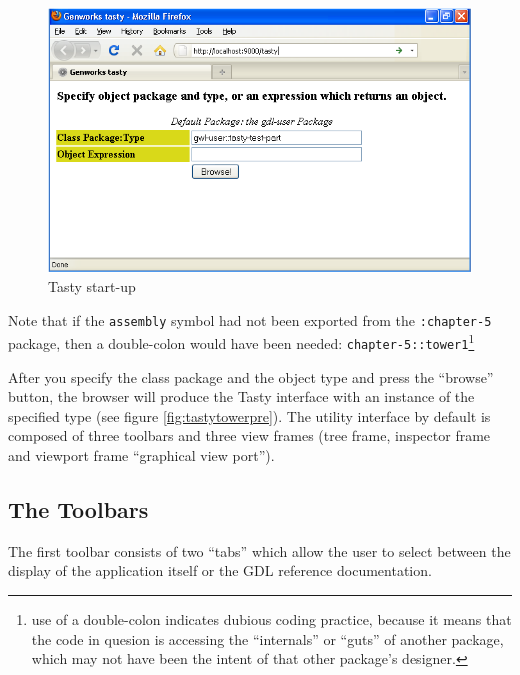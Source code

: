 \documentclass [11pt]{book}
\begin{document}
\begin{figure}
\begin{center}
\includegraphics{../images/tasty-start.png}
\end{center}

\caption{Tasty start-up}

\label{fig:tasty-startup}

\end{figure}


Note that if the \texttt{assembly} symbol had not been exported from the \texttt{:chapter-5} package, then a double-colon would have been needed: \texttt{chapter-5::tower1}\footnote{use of a double-colon indicates dubious coding
practice, because it means that the code in quesion is accessing the
``internals'' or ``guts'' of another package, which may not have been
the intent of that other package's designer.}



After you specify the class package and the object type and
press the ``browse'' button, the browser will produce the Tasty
interface with an instance of the specified type (see figure 
\ref{fig:tastytowerpre}). The utility interface
by default is composed of three toolbars and three view frames (tree
frame, inspector frame and viewport frame ``graphical view port'').



\subsection{The Toolbars}

\label{subsec:thetoolbars}



The first toolbar consists of two ``tabs'' which allow the
user to select between the display of the application itself or the
GDL reference documentation.
\end{document}

